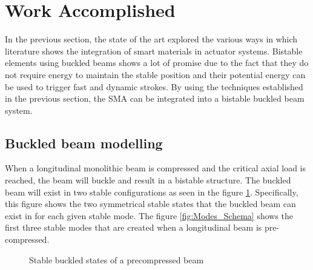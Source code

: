 \section{Work Accomplished}\label{sec:work_accomplished}
In the previous section, the state of the art explored the various ways in which literature shows the integration of smart materials in actuator systems. Bistable elements using buckled beams shows a lot of promise due to the fact that they do not require energy to maintain the stable position and their potential energy can be used to trigger fast and dynamic strokes. By using the techniques established in the previous section, the SMA can be integrated into a bistable buckled beam system.
\subsection{Buckled beam modelling}
When a longitudinal monolithic beam is compressed and the critical axial load is reached, the beam will buckle and result in a bistable structure. The buckled beam will exist in two stable configurations as seen in the figure \ref{fig:States_Schema}. Specifically, this figure shows the two symmetrical stable states that the buckled beam can exist in for each given stable mode. The figure \ref{fig:Modes_Schema} shows the first three stable modes that are created when a longitudinal beam is pre-compressed.

\begin{figure}[H]
	\centering
  {\tiny
	\def\svgwidth{0.4\textwidth}
	
  }
	\caption{Stable buckled states of a precompressed beam}
	\label{fig:States_Schema}
\end{figure}

